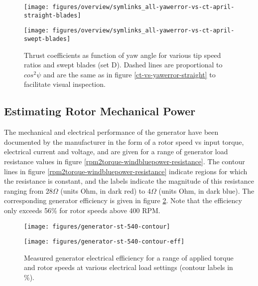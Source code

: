 \documentclass[a4paper]{jpconf}
\begin{document}
\begin{figure}[h]
\begin{minipage}{17pc}
\texttt{[image: figures/overview/symlinks\_all-yawerror-vs-ct-april-straight-blades]}
\caption{\label{ct-vs-yawerror-straight} Thrust coefficients as function of yaw angle for various tip speed ratios and straight blades (sets A and B). Dashed lines are proportional to $cos^2 \psi$ and are the same as in figure \ref{ct-vs-yawerror-swept} to facilitate visual inspection.}
\end{minipage}\hspace{3pc}%
\begin{minipage}{17pc}
\texttt{[image: figures/overview/symlinks\_all-yawerror-vs-ct-april-swept-blades]}
\caption{\label{ct-vs-yawerror-swept} Thrust coefficients as function of yaw angle for various tip speed ratios and swept blades (set D). Dashed lines are proportional to $cos^2 \psi$ and are the same as in figure \ref{ct-vs-yawerror-straight} to facilitate visual inspection.}
\end{minipage} 
\end{figure}


\subsection{Estimating Rotor Mechanical Power}

The mechanical and electrical performance of the generator have been documented by the manufacturer in the form of a rotor speed vs input torque, electrical current and voltage, and are given for a range of generator load resistance values in figure \ref{rpm2torque-windbluepower-resistance}. The contour lines in figure \ref{rpm2torque-windbluepower-resistance} indicate regions for which the resistance is constant, and the labels indicate the magnitude of this resistance ranging from $28 \Omega$ (units Ohm, in dark red) to $4 \Omega$ (units Ohm, in dark blue). The corresponding generator efficiency is given in figure \ref{rpm2torque-windbluepower-eff}. Note that the efficiency only exceeds 56\% for rotor speeds above 400 RPM. 

\begin{figure}[h]
\centering
\begin{minipage}{18pc}
\centering
\texttt{[image: figures/generator-st-540-contour]}
\caption{\label{rpm2torque-windbluepower-resistance} Measured applied torque and rotor speed for various electrical load settings (contour labels units are in Ohm).}
\end{minipage}\hspace{1pc}%
\begin{minipage}{18pc}
\centering
\texttt{[image: figures/generator-st-540-contour-eff]}
\caption{\label{rpm2torque-windbluepower-eff} Measured generator electrical efficiency for a range of applied torque and rotor speeds at various electrical load settings (contour labels in \%).}
\end{minipage}
\end{figure}
\end{document}

